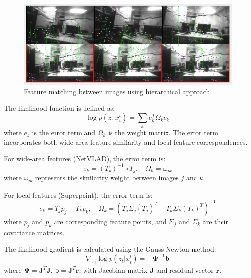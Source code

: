 \documentclass[a4paper,fleqn,10pt,twocolumn]{SICE_ISCS}
\begin{document}
\begin{figure}[t]
	\begin{center}
		\includegraphics[width=\linewidth]{Fig/matching_images.png}
		\caption{Feature matching between images using hierarchical approach}
		\label{fig:matching}
	\end{center}
	\vspace{-2mm}
\end{figure}

The likelihood function is defined as:
\begin{equation}
\log p(z_t | x_i^t) = \sum_k e_k^T \Omega_k e_k
\end{equation}
where $e_k$ is the error term and $\Omega_k$ is the weight matrix. The error term incorporates both wide-area feature similarity and local feature correspondences.

For wide-area features (NetVLAD), the error term is:
\begin{equation}
e_k = (T_k)^{-1} \circ T_j, \quad \Omega_k = \omega_{jk}
\end{equation}
where $\omega_{jk}$ represents the similarity weight between images $j$ and $k$.

For local features (Superpoint), the error term is:
\begin{equation}
e_k = T_j p_j - T_k p_k, \quad \Omega_k = \left(T_j \Sigma_j (T_j)^T + T_k \Sigma_k (T_k)^T\right)^{-1}
\end{equation}
where $p_j$ and $p_k$ are corresponding feature points, and $\Sigma_j$ and $\Sigma_k$ are their covariance matrices.

The likelihood gradient is calculated using the Gauss-Newton method:
\begin{equation}
\nabla_{x_i^t} \log p(z_t | x_i^t) = -\boldsymbol{\Psi}^{-1} \mathbf{b}
\end{equation}
where $\boldsymbol{\Psi} = \mathbf{J}^T \mathbf{J}$, $\mathbf{b} = \mathbf{J}^T \mathbf{r}$, with Jacobian matrix $\mathbf{J}$ and residual vector $\mathbf{r}$.
\end{document}
